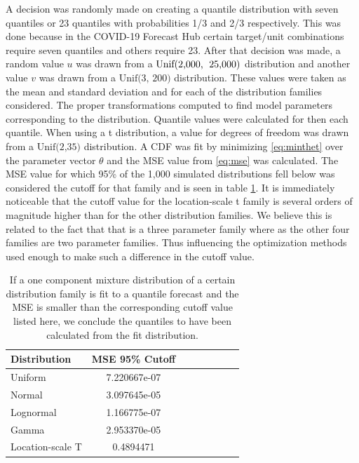 \documentclass[11pt,notitlepage]{isuthesis}
\begin{document}
A decision was randomly made on creating a quantile distribution with seven 
quantiles or 23
quantiles with probabilities 1/3 and 2/3 respectively. This was done because 
in the COVID-19 Forecast Hub certain target/unit combinations require 
seven quantiles and others 
require 23. After that decision was made, a random value $u$ was drawn from
a $\mbox{Unif(2,000,\; 25,000)}$ distribution and another value $v$ was drawn
from a $\mbox{Unif(3, 200)}$ distribution. These values were taken as the mean 
and
standard deviation and for each of the distribution families considered. The
proper transformations computed to find model parameters corresponding to the 
distribution. Quantile values were calculated for then each quantile. When using 
a t distribution, a value for degrees of freedom was drawn from a 
$\mbox{Unif(2,35)}$ distribution. A CDF
was fit by minimizing \eqref{eq:minthet} over the parameter
vector $\theta$ and the MSE value from \eqref{eq:mse} was 
calculated. The MSE value for which 95\% of the 1,000 simulated distributions
fell below was considered the cutoff for that family and is seen in table 
\ref{table:quantcutoffs}. It is immediately noticeable that the cutoff value 
for the location-scale t family is several orders of magnitude higher than for 
the other distribution families. We believe this is related to the fact that 
that is a three parameter family where as the other four families are two 
parameter families. Thus influencing the optimization methods used enough to 
make such a difference in the cutoff value. 

\begin{table}[h!]
  \centering
  \begin{tabular}{l*{6}{c}r}
  Distribution          & MSE 95\% Cutoff \\
  \hline
  Uniform               & 7.220667e-07   \\
  Normal                & 3.097645e-05  \\
  Lognormal             & 1.166775e-07  \\
  Gamma                 & 2.953370e-05  \\
  Location-scale T      & 0.4894471 \\
  \end{tabular}
  \begin{center}
\begin{minipage}{10cm}
\captionsetup{font=scriptsize}
  \caption[Quantile cutoff values]{If a one component mixture distribution of a
  certain distribution family
  is fit to a quantile forecast and the MSE is smaller than
  the corresponding cutoff value listed here, we conclude the quantiles to 
  have been calculated from the fit distribution.}
  \label{table:quantcutoffs}
  \end{minipage}
  \end{center}
\end{table}
\end{document}

